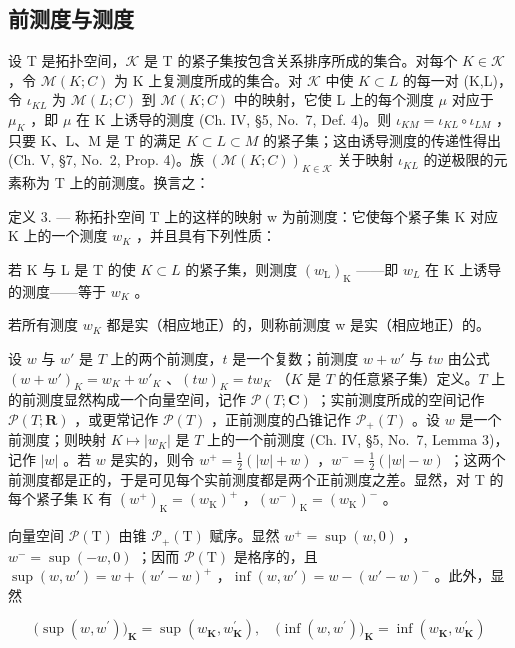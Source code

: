 \subsection{前测度与测度}

设 T 是拓扑空间，\(\mathcal{K}\) 是 T 的紧子集按包含关系排序所成的集合。对每个 \(K\in\mathcal{K}\) ，令 \(\mathcal{M}(K;C)\) 为 K 上复测度所成的集合。对 \(\mathcal{K}\) 中使 \(K\subset L\) 的每一对 (K,L)，令 \(\iota_{KL}\) 为 \(\mathcal{M}(L;C)\) 到 \(\mathcal{M}(K;C)\) 中的映射，它使 L 上的每个测度 \(\mu\) 对应于 \(\mu_{K}\) ，即 \(\mu\) 在 K 上诱导的测度 (Ch. IV, §5, No.~7, Def. 4)。则 \(\iota_{KM}=\iota_{KL}\circ\iota_{LM}\) ，只要 K、L、M 是 T 的满足 \(K\subset L\subset M\) 的紧子集；这由诱导测度的传递性得出 (Ch. V, §7, No.~2, Prop. 4)。族 \((\mathcal{M}(K;C))_{K\in\mathcal{K}}\) 关于映射 \(\iota_{KL}\) 的逆极限的元素称为 T 上的前测度。换言之：

定义 3. --- 称拓扑空间 T 上的这样的映射 w 为前测度：它使每个紧子集 K 对应 K 上的一个测度 \(w_{K}\) ，并且具有下列性质：

若 K 与 L 是 T 的使 \(K \subset L\) 的紧子集，则测度 \((w_{\mathrm{L}})_{\mathrm{K}}\) ——即 \(w_{L}\) 在 K 上诱导的测度——等于 \(w_{K}\) 。

若所有测度 \(w_{K}\) 都是实（相应地正）的，则称前测度 w 是实（相应地正）的。

设 \(w\) 与 \(w'\) 是 \(T\) 上的两个前测度，\(t\) 是一个复数；前测度 \(w + w'\) 与 \(tw\) 由公式 \((w + w')_K = w_K + w'_K\) 、\((tw)_K = tw_K\) （\(K\) 是 \(T\) 的任意紧子集）定义。\(T\) 上的前测度显然构成一个向量空间，记作 \(\mathcal{P}(T; \mathbf{C})\) ；实前测度所成的空间记作 \(\mathcal{P}(T; \mathbf{R})\) ，或更常记作 \(\mathcal{P}(T)\) ，正前测度的凸锥记作 \(\mathcal{P}_+(T)\) 。设 \(w\) 是一个前测度；则映射 \(K \mapsto |w_K|\) 是 \(T\) 上的一个前测度 (Ch. IV, §5, No.~7, Lemma 3)，记作 \(|w|\) 。若 \(w\) 是实的，则令 \(w^{+} = \frac{1}{2} (|w| + w)\) ，\(w^{-} = \frac{1}{2} (|w| - w)\) ；这两个前测度都是正的，于是可见每个实前测度都是两个正前测度之差。显然，对 T 的每个紧子集 K 有 \((w^{+})_{\mathrm{K}} = (w_{\mathrm{K}})^{+}\) ，\((w^{-})_{\mathrm{K}} = (w_{\mathrm{K}})^{-}\) 。

向量空间 \(\mathcal{P}(\mathrm{T})\) 由锥 \(\mathcal{P}_{+}(\mathrm{T})\) 赋序。显然 \(w^{+} = \sup(w,0)\) ，\(w^{-} = \sup(-w,0)\) ；因而 \(\mathcal{P}(\mathrm{T})\) 是格序的，且 \(\sup(w,w') = w + (w' - w)^{+}\) ，\(\inf(w,w') = w - (w' - w)^{-}\) 。此外，显然

\[
\big (\sup (w, w ^ {\prime}) \big) _ {\mathbf {K}} = \sup (w _ {\mathbf {K}}, w _ {\mathbf {K}} ^ {\prime}), \quad \big (\inf (w, w ^ {\prime}) \big) _ {\mathbf {K}} = \inf (w _ {\mathbf {K}}, w _ {\mathbf {K}} ^ {\prime})
\]

